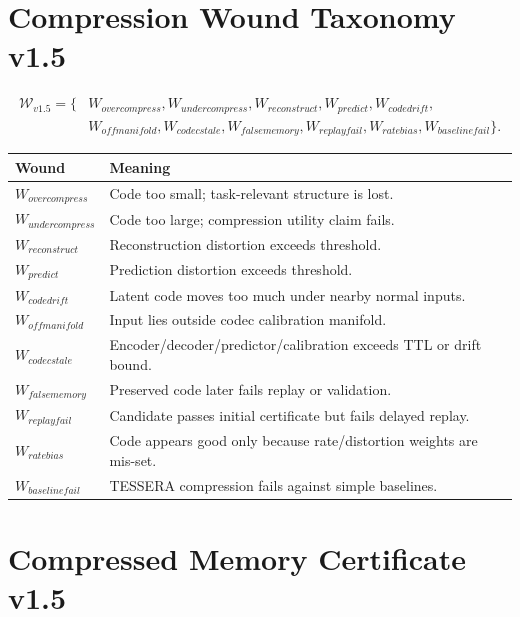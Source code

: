 \documentclass[12pt]{article}
\begin{document}
\section{Compression Wound Taxonomy v1.5}

\[
\begin{aligned}
\mathcal{W}_{v1.5}=\{&W_{overcompress},W_{undercompress},W_{reconstruct},W_{predict},
W_{codedrift},\\
&W_{offmanifold},W_{codecstale},W_{falsememory},W_{replayfail},
W_{ratebias},W_{baselinefail}\}.
\end{aligned}
\]

\begin{longtable}{p{}p{}}
\toprule
\textbf{Wound} & \textbf{Meaning} \\
\midrule
$W_{overcompress}$ & Code too small; task-relevant structure is lost. \\
$W_{undercompress}$ & Code too large; compression utility claim fails. \\
$W_{reconstruct}$ & Reconstruction distortion exceeds threshold. \\
$W_{predict}$ & Prediction distortion exceeds threshold. \\
$W_{codedrift}$ & Latent code moves too much under nearby normal inputs. \\
$W_{offmanifold}$ & Input lies outside codec calibration manifold. \\
$W_{codecstale}$ & Encoder/decoder/predictor/calibration exceeds TTL or drift bound. \\
$W_{falsememory}$ & Preserved code later fails replay or validation. \\
$W_{replayfail}$ & Candidate passes initial certificate but fails delayed replay. \\
$W_{ratebias}$ & Code appears good only because rate/distortion weights are mis-set. \\
$W_{baselinefail}$ & TESSERA compression fails against simple baselines. \\
\bottomrule
\end{longtable}

\section{Compressed Memory Certificate v1.5}
\end{document}
